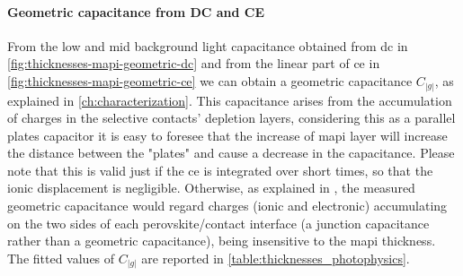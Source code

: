 	\paragraph{Geometric capacitance from DC and CE}
	From the low and mid background light capacitance obtained from \gls{dc} in \cref{fig:thicknesses-mapi-geometric-dc} and from the linear part of \gls{ce} in \cref{fig:thicknesses-mapi-geometric-ce} we can obtain a geometric capacitance $C_|g|$, as explained in \cref{ch:characterization}.
	This capacitance arises from the accumulation of charges in the selective contacts' depletion layers, considering this as a parallel plates capacitor it is easy to foresee that the increase of \gls{mapi} layer will increase the distance between the "plates" and cause a decrease in the capacitance.
	Please note that this is valid just if the \gls{ce} is integrated over short times, so that the ionic displacement is negligible.
	Otherwise, as explained in , the measured geometric capacitance would regard charges (ionic and electronic) accumulating on the two sides of each perovskite\-/contact interface (a junction capacitance rather than a geometric capacitance), being insensitive to the \gls{mapi} thickness.
	The fitted values of $C_|g|$ are reported in \cref{table:thicknesses_photophysics}.

	\begin{figure}
	\end{figure}

